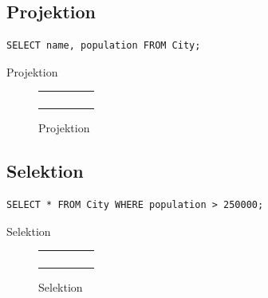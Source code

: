 \documentclass[a4paper]{article}
\begin{document}
\subsection{Projektion}

\begin{listing}[H]
\begin{verbatim}
SELECT name, population FROM City;
\end{verbatim}
\caption{Projektion}
\end{listing}

\begin{figure}[H]
\centering
  \begin{tabular}{| c | c | c | c | c |}
    \hline
     & \cellcolor{cell} & \cellcolor{cell} & & \cellcolor{cell} \\ \hline
     & \cellcolor{cell} & \cellcolor{cell} & & \cellcolor{cell} \\ \hline
     & \cellcolor{cell} & \cellcolor{cell} & & \cellcolor{cell} \\ \hline
     & \cellcolor{cell} & \cellcolor{cell} & & \cellcolor{cell} \\ \hline
     & \cellcolor{cell} & \cellcolor{cell} & & \cellcolor{cell} \\ \hline
  \end{tabular}
\caption{Projektion}
\end{figure}

\subsection{Selektion}

\begin{listing}[H]
\begin{verbatim}
SELECT * FROM City WHERE population > 250000;
\end{verbatim}
\caption{Selektion}
\end{listing}

\begin{figure}[H]
\centering
  \begin{tabular}{| c | c | c | c | c |}
    \hline
     & &  & &\\ \hline
    \cellcolor{cell} & \cellcolor{cell} & \cellcolor{cell} &  \cellcolor{cell} & \cellcolor{cell} \\ \hline
    \cellcolor{cell} & \cellcolor{cell} & \cellcolor{cell} &  \cellcolor{cell} & \cellcolor{cell} \\ \hline
     & &  & &\\ \hline
    \cellcolor{cell} & \cellcolor{cell} & \cellcolor{cell} &  \cellcolor{cell} & \cellcolor{cell} \\ \hline
  \end{tabular}
\caption{Selektion}
\end{figure}
\end{document}
